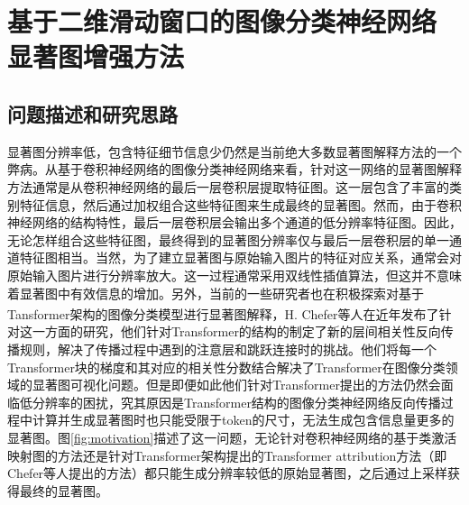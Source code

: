 




\chapter[基于二维滑动窗口的图像分类神经网络显著图增强方法]{\texorpdfstring{基于二维滑动窗口的图像分类神经网络\\显著图增强方法}{基于二维滑动窗口的图像分类神经网络显著图增强方法}}

\thispagestyle{others}
\pagestyle{others}
\xiaosi




\section{问题描述和研究思路}

显著图分辨率低，包含特征细节信息少仍然是当前绝大多数显著图解释方法的一个弊病。从基于卷积神经网络的图像分类神经网络来看，针对这一网络的显著图解释方法通常是从卷积神经网络的最后一层卷积层提取特征图。这一层包含了丰富的类别特征信息，然后通过加权组合这些特征图来生成最终的显著图。然而，由于卷积神经网络的结构特性，最后一层卷积层会输出多个通道的低分辨率特征图。因此，无论怎样组合这些特征图，最终得到的显著图分辨率仅与最后一层卷积层的单一通道特征图相当。当然，为了建立显著图与原始输入图片的特征对应关系，通常会对原始输入图片进行分辨率放大。这一过程通常采用双线性插值算法，但这并不意味着显著图中有效信息的增加。另外，当前的一些研究者也在积极探索对基于Tansformer架构的图像分类模型进行显著图解释，H. Chefer等人\textsuperscript{\cite{chefer2021transformer}}在近年发布了针对这一方面的研究，他们针对Transformer的结构的制定了新的层间相关性反向传播规则，解决了传播过程中遇到的注意层和跳跃连接时的挑战。他们将每一个Transformer块的梯度和其对应的相关性分数结合解决了Transformer在图像分类领域的显著图可视化问题。但是即便如此他们针对Transformer提出的方法仍然会面临低分辨率的困扰，究其原因是Transformer结构的图像分类神经网络反向传播过程中计算并生成显著图时也只能受限于token的尺寸，无法生成包含信息量更多的显著图。图\ref{fig:motivation}描述了这一问题，无论针对卷积神经网络的基于类激活映射图的方法还是针对Transformer架构提出的Transformer attribution方法（即Chefer等人提出的方法）都只能生成分辨率较低的原始显著图，之后通过上采样获得最终的显著图。

